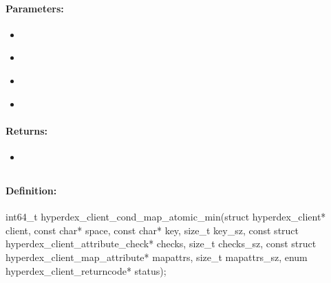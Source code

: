\paragraph{Parameters:}
\begin{itemize}[noitemsep]
\item {}\\

\item {}\\

\item {}\\

\item {}\\

\end{itemize}

\paragraph{Returns:}
\begin{itemize}[noitemsep]
\item {}\\

\end{itemize}

\pagebreak
\subsection{}
\label{api:c:cond_map_atomic_min}


\paragraph{Definition:}
\begin{ccode}
int64_t hyperdex_client_cond_map_atomic_min(struct hyperdex_client* client,
        const char* space,
        const char* key, size_t key_sz,
        const struct hyperdex_client_attribute_check* checks, size_t checks_sz,
        const struct hyperdex_client_map_attribute* mapattrs, size_t mapattrs_sz,
        enum hyperdex_client_returncode* status);
\end{ccode}

